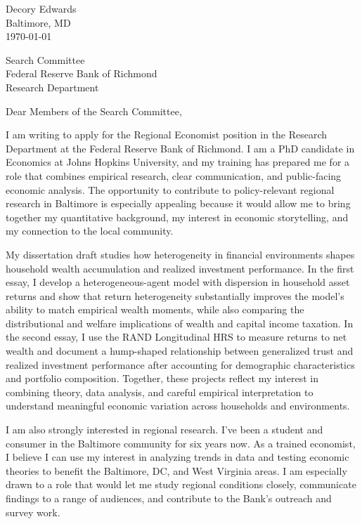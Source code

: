 \documentclass[11pt]{article}
\begin{document}
Decory Edwards \\
Baltimore, MD \\
\today

\vspace{1em}

Search Committee \\
Federal Reserve Bank of Richmond \\
Research Department

\vspace{1em}

Dear Members of the Search Committee,

I am writing to apply for the Regional Economist position in the Research Department at the Federal Reserve Bank of Richmond. I am a PhD candidate in Economics at Johns Hopkins University, and my training has prepared me for a role that combines empirical research, clear communication, and public-facing economic analysis. The opportunity to contribute to policy-relevant regional research in Baltimore is especially appealing because it would allow me to bring together my quantitative background, my interest in economic storytelling, and my connection to the local community.

My dissertation draft studies how heterogeneity in financial environments shapes household wealth accumulation and realized investment performance. In the first essay, I develop a heterogeneous-agent model with dispersion in household asset returns and show that return heterogeneity substantially improves the model's ability to match empirical wealth moments, while also comparing the distributional and welfare implications of wealth and capital income taxation. In the second essay, I use the RAND Longitudinal HRS to measure returns to net wealth and document a hump-shaped relationship between generalized trust and realized investment performance after accounting for demographic characteristics and portfolio composition. Together, these projects reflect my interest in combining theory, data analysis, and careful empirical interpretation to understand meaningful economic variation across households and environments.

I am also strongly interested in regional research. I've been a student and consumer in the Baltimore community for six years now. As a trained economist, I believe I can use my interest in analyzing trends in data and testing economic theories to benefit the Baltimore, DC, and West Virginia areas. I am especially drawn to a role that would let me study regional conditions closely, communicate findings to a range of audiences, and contribute to the Bank's outreach and survey work.
\end{document}
